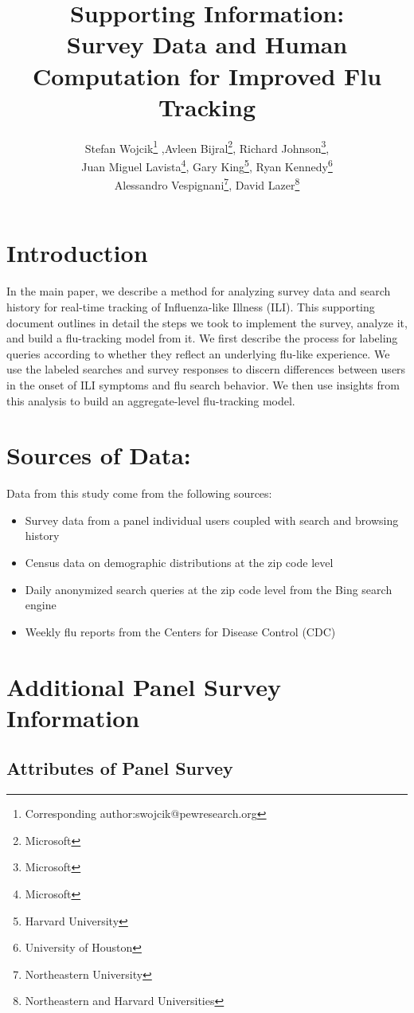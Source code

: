 \documentclass[12pt]{article}
\title{Supporting Information: \\ Survey Data and Human Computation for Improved Flu Tracking}
\author{Stefan Wojcik\footnote{Corresponding author:swojcik@pewresearch.org}
,Avleen Bijral\footnote{Microsoft}, 
Richard Johnson\footnote{Microsoft},\\
Juan Miguel Lavista\footnote{Microsoft}, 
Gary King\footnote{Harvard University}, 
Ryan Kennedy\footnote{University of Houston}\\ 
Alessandro Vespignani\footnote{Northeastern University},
David Lazer\footnote{Northeastern and Harvard Universities}}
\begin{document}
\maketitle

\clearpage

\tableofcontents

\clearpage

\singlespacing

\newpage

\section{Introduction}

In the main paper, we describe a method for analyzing survey data and search history for real-time tracking of Influenza-like Illness (ILI). This supporting document outlines in detail the steps we took to implement the survey, analyze it, and build a flu-tracking model from it. We first describe the process for labeling queries according to whether they reflect an underlying flu-like experience. We use the labeled searches and survey responses to discern differences between users in the onset of ILI symptoms and flu search behavior. We then use insights from this analysis to build an aggregate-level flu-tracking model. 

\section{Sources of Data:}
Data from this study come from the following sources:
\begin{itemize}
\item Survey data from a panel individual users coupled with search and browsing history
\item Census data on demographic distributions at the zip code level
\item Daily anonymized search queries at the zip code level from the Bing search engine
\item Weekly flu reports from the Centers for Disease Control (CDC)
\end{itemize}

\section{Additional Panel Survey Information}

\subsection{Attributes of Panel Survey}
\end{document}
